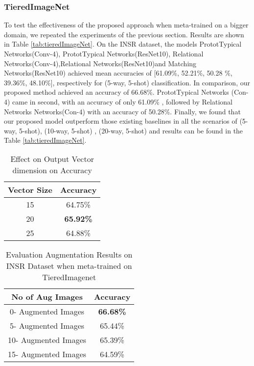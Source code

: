 \subsubsection{TieredImageNet} To test the effectiveness of the proposed approach when meta-trained on a bigger domain, we repeated the experiments of the previous section.
Results are shown in Table \ref{tab:tieredImageNet}. On the INSR dataset, the models PrototTypical Networks(Conv-4), PrototTypical Networks(ResNet10), Relational Networks(Conv-4),Relational Networks(ResNet10)and Matching Networks(ResNet10)
achieved mean accuracies of [61.09\%, 52.21\%, 50.28 \%, 39.36\%, 48.10\%], respectively for (5-way, 5-shot) classification. In comparison, our proposed method achieved an accuracy of 
66.68\%. PrototTypical Networks (Con-4) came in second, with an accuracy of
only 61.09\% , followed by Relational Networks Networks(Con-4) with an accuracy of
50.28\%. Finally, we found that our proposed model outperform those existing baselines
in all the scenarios of  (5-way, 5-shot), (10-way, 5-shot) , (20-way, 5-shot) and results can be found in the Table \ref{tab:tieredImageNet}.

\begin{table}[ht]
\centering
{\small
\begin{tabular}{cc} 
\toprule
\textbf{Vector Size} & \textbf{Accuracy}\\
\midrule
    15 &  64.75\% \\
    20 & \textbf{65.92\% } \\
    25& 64.88\%  \\
\hline
\bottomrule
\end{tabular}
\caption{Effect on Output Vector dimension on Accuracy}
\label{tab:albation_vectorsize}
}
\end{table}
\vspace{-0.6cm}
\begin{table}
\centering
{\small
\begin{tabular}{cc}
\toprule 
No of Aug Images & Accuracy \\
\midrule
0- Augmented Images & \textbf{66.68\% } \\
5- Augmented Images  & 65.44\% \\
10- Augmented Images & 65.39\%   \\
15- Augmented Images  & 64.59\%  \\
\hline
\bottomrule
\end{tabular}
\caption{Evaluation Augmentation Results on INSR Dataset when meta-trained on TieredImagenet}
\label{tab:ablation_augmentaion}
}
\end{table}
